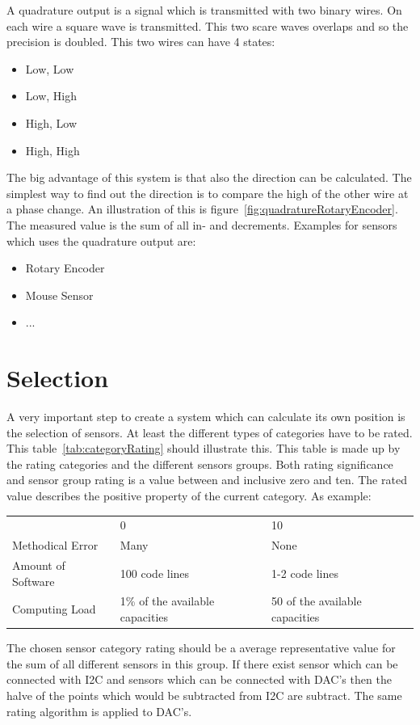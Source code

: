 A quadrature output is a signal which is transmitted with two binary wires.
On each wire a square wave is transmitted.
This two scare waves overlaps and so the precision is doubled.
This two wires can have 4 states:
\begin{itemize}
\item Low, Low
\item Low, High
\item High, Low
\item High, High
\end{itemize}
The big advantage of this system is that also the direction can be calculated.
The simplest way to find out the direction is to compare the high of the other wire at a phase change.
An illustration of this is figure~\ref{fig:quadratureRotaryEncoder}.
The measured value is the sum of all in- and decrements.
Examples for sensors which uses the quadrature output are:
\begin{itemize}
\item Rotary Encoder
\item Mouse Sensor
\item ...
\end{itemize}


\section{Selection}
A very important step to create a system which can calculate its own position is the selection of sensors.
At least the different types of categories have to be rated.
This table~\ref{tab:categoryRating} should illustrate this.
This table is made up by the rating categories and the different sensors groups.
Both rating significance and sensor group rating is a value between and inclusive zero and ten.
The rated value describes the positive property of the current category.
As example:\\
\begin{tabular}{l|l|l}
& 0 & 10 \\
Methodical Error & Many & None\\
Amount of Software & 100 code lines & 1-2 code lines\\
Computing Load & 1\% of the available capacities & 50 of the available capacities\\
\end{tabular}
The chosen sensor category rating should be a average representative value for the sum of all different sensors in this group.
If there exist sensor which can be connected with I2C and sensors which can be connected with DAC's then the halve of the points which would be subtracted from I2C are subtract. The same rating algorithm is applied to DAC's.



